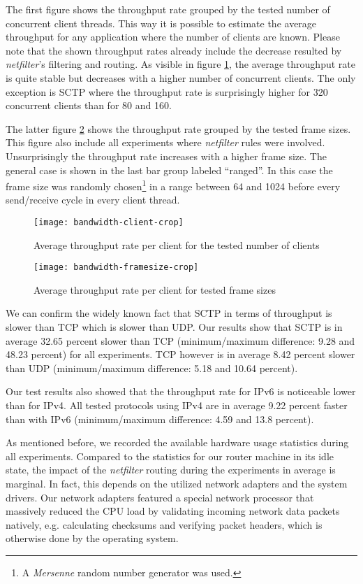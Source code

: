 \documentclass{sig-alternate}
\begin{document}
The first figure shows the throughput rate grouped by the tested number of 
concurrent client threads. This way it is possible to estimate the average 
throughput for any application where the number of clients are known. Please 
note that the shown throughput rates already include the decrease resulted by 
\emph{netfilter}'s filtering and routing. As visible in figure 
\ref{fig::throughput-client}, the average throughput rate is quite stable but 
decreases with a higher number of concurrent clients. The only exception is 
SCTP 
where the throughput rate is surprisingly higher for 320 concurrent clients 
than 
for 80 and 160.

The latter figure \ref{fig::throughput-framesize} shows the throughput rate
grouped by the tested frame sizes. This figure also include all experiments 
where \emph{netfilter} rules were involved. Unsurprisingly the throughput rate 
increases with a higher frame size. The general case is shown in the last bar 
group labeled ``ranged''. In this case the frame size was randomly 
chosen\footnote{A \emph{Mersenne} random number generator was used.} in a range 
between 64 and 1024 before every send/receive cycle in every client thread.

\begin{figure}[!t]
\texttt{[image: bandwidth-client-crop]}
\caption{Average throughput rate per client for the tested number of clients}
\label{fig::throughput-client}
\end{figure}

\begin{figure}[!t]
\texttt{[image: bandwidth-framesize-crop]}
\caption{Average throughput rate per client for tested frame sizes}
\label{fig::throughput-framesize}
\end{figure}

We can confirm the widely known fact that SCTP in terms of throughput is slower 
than TCP which is slower than UDP. Our results show that SCTP is in average 
32.65 percent slower than TCP (minimum/maximum difference: 9.28 and 48.23 
percent) for all experiments. TCP however is in average 8.42 percent slower 
than UDP (minimum/maximum difference: 5.18 and 10.64 percent). 

Our test results also showed that the throughput rate for IPv6 is noticeable 
lower than for IPv4. All tested protocols using IPv4 are in average 9.22 
percent faster than with IPv6 (minimum/maximum difference: 4.59 and 13.8 
percent).

As mentioned before, we recorded the available hardware usage statistics during 
all experiments. Compared to the statistics for our router machine in its idle 
state, the impact of the \emph{netfilter} routing during the experiments in 
average is marginal. In fact, this depends on the utilized network adapters and 
the system drivers. Our network adapters featured a special network processor 
that massively reduced the CPU load by va\-li\-da\-ting incoming network data 
packets natively, e.g. calculating checksums and verifying packet headers, 
which 
is otherwise done by the operating system.
\end{document}
